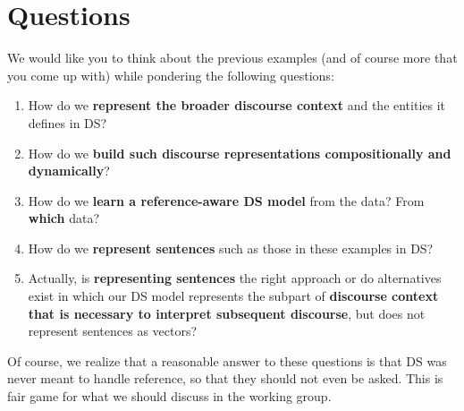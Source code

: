 \documentclass[a4paper,12pt]{article}
\begin{document}

\section{Questions}
\label{sec:questions}

We would like you to think about the previous examples (and of course
more that you come up with) while pondering the following questions:

\begin{enumerate}
\item How do we \textbf{represent the broader discourse context} and
  the entities it defines in DS?
\item How do we \textbf{build such discourse representations
  compositionally and dynamically}?
\item How do we \textbf{learn a reference-aware DS model} from the
  data? From \textbf{which} data?
\item How do we \textbf{represent sentences} such as those in these
  examples in DS?
\item Actually, is \textbf{representing sentences} the right
  approach or do alternatives exist in which 
our DS model represents
  the subpart of \textbf{discourse context that is necessary to
  interpret subsequent discourse}, but does not represent
  sentences as vectors?
\end{enumerate}

Of course, we realize that a reasonable answer to these questions is
that DS was never meant to handle reference, so that they should not
even be asked. This is fair game for what we should discuss in the
working group.
\end{document}
